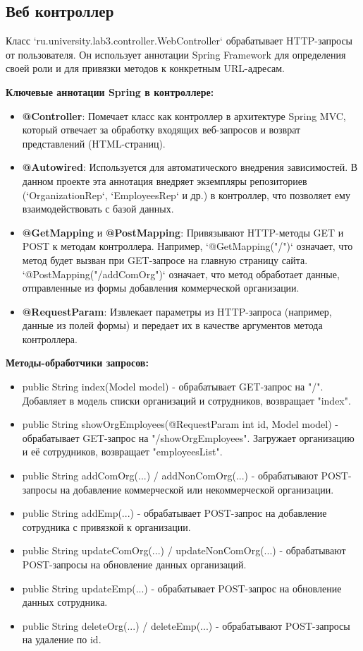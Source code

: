 \documentclass[oneside,a4paper,14pt]{extarticle}
\begin{document}
\newpage

\subsection*{Веб контроллер}

Класс `ru.university.lab3.controller.WebController` обрабатывает HTTP-запросы от пользователя. Он использует аннотации Spring Framework для определения своей роли и для привязки методов к конкретным URL-адресам.

\textbf{Ключевые аннотации Spring в контроллере:}
\begin{itemize}
    \item \textbf{@Controller}: Помечает класс как контроллер в архитектуре Spring MVC, который отвечает за обработку входящих веб-запросов и возврат представлений (HTML-страниц).
    \item \textbf{@Autowired}: Используется для автоматического внедрения зависимостей. В данном проекте эта аннотация внедряет экземпляры репозиториев (`OrganizationRep`, `EmployeesRep` и др.) в контроллер, что позволяет ему взаимодействовать с базой данных.
    \item \textbf{@GetMapping} и \textbf{@PostMapping}: Привязывают HTTP-методы GET и POST к методам контроллера. Например, `@GetMapping("/")` означает, что метод будет вызван при GET-запросе на главную страницу сайта. `@PostMapping("/addComOrg")` означает, что метод обработает данные, отправленные из формы добавления коммерческой организации.
    \item \textbf{@RequestParam}: Извлекает параметры из HTTP-запроса (например, данные из полей формы) и передает их в качестве аргументов метода контроллера.
\end{itemize}

\textbf{Методы-обработчики запросов:}
\begin{itemize}
    \item public String index(Model model) - обрабатывает GET-запрос на "/". Добавляет в модель списки организаций и сотрудников, возвращает "index".
    \item public String showOrgEmployees(@RequestParam int id, Model model) - обрабатывает GET-запрос на "/showOrgEmployees". Загружает организацию и её сотрудников, возвращает "employeesList".
    \item public String addComOrg(...) / addNonComOrg(...) - обрабатывают POST-запросы на добавление коммерческой или некоммерческой организации.
    \item public String addEmp(...) - обрабатывает POST-запрос на добавление сотрудника с привязкой к организации.
    \item public String updateComOrg(...) / updateNonComOrg(...) - обрабатывают POST-запросы на обновление данных организаций.
    \item public String updateEmp(...) - обрабатывает POST-запрос на обновление данных сотрудника.
    \item public String deleteOrg(...) / deleteEmp(...) - обрабатывают POST-запросы на удаление по id.
\end{itemize}
\end{document}
